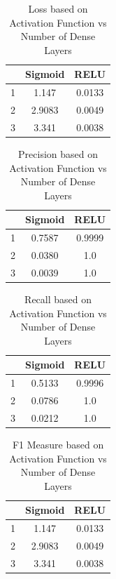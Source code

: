 \documentclass[conference]{IEEEtran}
\begin{document}
\begin{table}[h!]
    \centering
    \begin{tabular}{|c|c|c|}
    \hline
          & Sigmoid & RELU\\ \hline
         1& 1.147 & 0.0133\\ \hline
         2& 2.9083 & 0.0049\\ \hline
         3& 3.341 & 0.0038\\ \hline
    \end{tabular}
    \vspace{3pt}
    \caption{Loss based on Activation Function vs Number of Dense Layers}
    \label{tab:my_label}
\end{table}

\begin{table}[h!]
    \centering
    \begin{tabular}{|c|c|c|}
    \hline
          & Sigmoid & RELU\\ \hline
         1& 0.7587 & 0.9999\\ \hline
         2& 0.0380 & 1.0\\ \hline
         3& 0.0039 & 1.0\\ \hline
    \end{tabular}
    \vspace{3pt}
    \caption{Precision based on Activation Function vs Number of Dense Layers}
    \label{tab:my_label}
\end{table}

\begin{table}[h!]
    \centering
    \begin{tabular}{|c|c|c|}
    \hline
          & Sigmoid & RELU\\ \hline
         1& 0.5133 & 0.9996\\ \hline
         2& 0.0786 & 1.0\\ \hline
         3& 0.0212 & 1.0\\ \hline
    \end{tabular}
    \vspace{3pt}
    \caption{ Recall based on Activation Function vs Number of Dense Layers}
    \label{tab:my_label}
\end{table}

\begin{table}[h!]
    \centering
    \begin{tabular}{|c|c|c|}
    \hline
          & Sigmoid & RELU\\ \hline
         1& 1.147 & 0.0133\\ \hline
         2& 2.9083 & 0.0049\\ \hline
         3& 3.341 & 0.0038\\ \hline
    \end{tabular}
    \vspace{3pt}
    \caption{F1 Measure based on Activation Function vs Number of Dense Layers}
    \label{tab:my_label}
\end{table}
\end{document}
